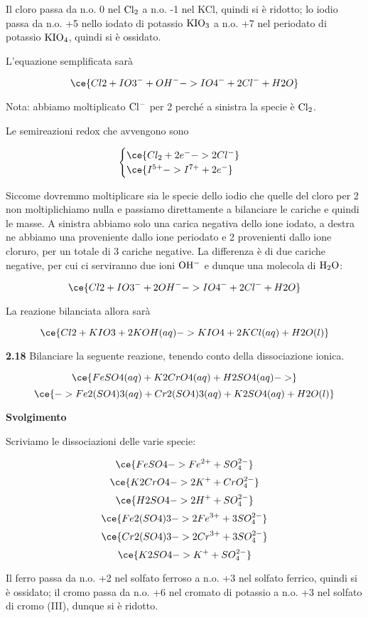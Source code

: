 Il cloro passa da n.o. 0 nel $\rm Cl_2$ a n.o. -1 nel KCl, quindi si è ridotto; lo iodio passa da n.o. +5 nello iodato di potassio $\rm KIO_3$ a n.o. +7 nel periodato di potassio $\rm KIO_4$, quindi si è ossidato.

L'equazione semplificata sarà

$$\ce{Cl2 + IO3^- + OH^- -> IO4^- + 2Cl^- + H2O}$$

Nota: abbiamo moltiplicato $\rm Cl^-$ per 2 perché a sinistra la specie è $\rm Cl_2$.

Le semireazioni redox che avvengono sono

$$\begin{cases}
    \ce{Cl_2 + 2e^- -> 2Cl^-}\\
    \ce{I^{5+} -> I^{7+} + 2e^-}
\end{cases}$$

Siccome dovremmo moltiplicare sia le specie dello iodio che quelle del cloro per 2 non moltiplichiamo nulla e passiamo direttamente a bilanciare le cariche e quindi le masse. A sinistra abbiamo solo una carica negativa dello ione iodato, a destra ne abbiamo una proveniente dallo ione periodato e 2 provenienti dallo ione cloruro, per un totale di 3 cariche negative. La differenza è di due cariche negative, per cui ci serviranno due ioni $\rm OH^-$ e dunque una molecola di $\rm H_2O$:

$$\ce{Cl2 + IO3^- + 2OH^- -> IO4^- + 2Cl^- + H2O}$$

La reazione bilanciata allora sarà

$$\ce{Cl2 + KIO3 + 2KOH(aq) -> KIO4 + 2KCl(aq) + H2O(l)}$$

\newpage

\textbf{2.18} Bilanciare la seguente reazione, tenendo conto della dissociazione ionica.

$$\ce{FeSO4(aq) + K2CrO4(aq) + H2SO4(aq) ->}$$
$$\ce{-> Fe2(SO4)3(aq) + Cr2(SO4)3(aq) + K2SO4(aq) + H2O(l)}$$

\large\textbf{Svolgimento}\normalsize

\vspace{0.2cm}Scriviamo le dissociazioni delle varie specie:

$$\ce{FeSO4 -> Fe^{2+} + SO_4^{2-}}$$
$$\ce{K2CrO4 -> 2K^+ + CrO_4^{2-}}$$
$$\ce{H2SO4 -> 2H^+ + SO_4^{2-}}$$
$$\ce{Fe2(SO4)3 -> 2Fe^{3+} + 3SO_4^{2-}}$$
$$\ce{Cr2(SO4)3 -> 2Cr^{3+} + 3SO_4^{2-}}$$
$$\ce{K2SO4 -> K^+ + SO_4^{2-}}$$

Il ferro passa da n.o. +2 nel solfato ferroso a n.o. +3 nel solfato ferrico, quindi si è ossidato; il cromo passa da n.o. +6 nel cromato di potassio a n.o. +3 nel solfato di cromo (III), dunque si è ridotto.

